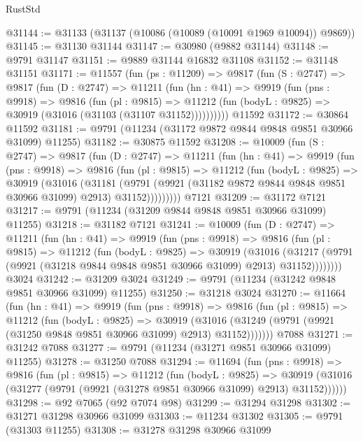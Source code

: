 \begin{lexlean}{RustStd}
\begin{coremodule}
@31144 := @31133 (@31137 (@10086 (@10089 (@10091 @1969 @10094)) @9869))
@31145 := @31130 @31144
@31147 := @30980 (@9882 @31144)
@31148 := @9791 @31147
@31151 := @9889 @31144 @16832 @31108
@31152 := @31148 @31151
@31171 := @11557
    (fun (ps : @11209) =>
    @9817
      (fun (S : @2747) =>
      @9817
        (fun (D : @2747) =>
        @11211
          (fun (hn : @41) =>
          @9919
            (fun (pns : @9918) =>
            @9816
              (fun (pl : @9815) =>
              @11212 (fun (bodyL : @9825) => @30919 (@31016 (@31103 (@31107 @31152))))))))))
    @11592
@31172 := @30864 @11592
@31181 := @9791 (@11234 (@31172 @9872 @9844 @9848 @9851 @30966 @31099) @11255)
@31182 := @30875 @11592
@31208 := @10009
    (fun (S : @2747) =>
    @9817
      (fun (D : @2747) =>
      @11211
        (fun (hn : @41) =>
        @9919
          (fun (pns : @9918) =>
          @9816
            (fun (pl : @9815) =>
            @11212
              (fun (bodyL : @9825) =>
              @30919
                (@31016
                  (@31181
                    (@9791
                      (@9921 (@31182 @9872 @9844 @9848 @9851 @30966 @31099) @2913)
                      @31152)))))))))
    @7121
@31209 := @31172 @7121
@31217 := @9791 (@11234 (@31209 @9844 @9848 @9851 @30966 @31099) @11255)
@31218 := @31182 @7121
@31241 := @10009
    (fun (D : @2747) =>
    @11211
      (fun (hn : @41) =>
      @9919
        (fun (pns : @9918) =>
        @9816
          (fun (pl : @9815) =>
          @11212
            (fun (bodyL : @9825) =>
            @30919
              (@31016
                (@31217 (@9791 (@9921 (@31218 @9844 @9848 @9851 @30966 @31099) @2913) @31152))))))))
    @3024
@31242 := @31209 @3024
@31249 := @9791 (@11234 (@31242 @9848 @9851 @30966 @31099) @11255)
@31250 := @31218 @3024
@31270 := @11664
    (fun (hn : @41) =>
    @9919
      (fun (pns : @9918) =>
      @9816
        (fun (pl : @9815) =>
        @11212
          (fun (bodyL : @9825) =>
          @30919
            (@31016 (@31249 (@9791 (@9921 (@31250 @9848 @9851 @30966 @31099) @2913) @31152)))))))
    @7088
@31271 := @31242 @7088
@31277 := @9791 (@11234 (@31271 @9851 @30966 @31099) @11255)
@31278 := @31250 @7088
@31294 := @11694
    (fun (pns : @9918) =>
    @9816
      (fun (pl : @9815) =>
      @11212
        (fun (bodyL : @9825) =>
        @30919 (@31016 (@31277 (@9791 (@9921 (@31278 @9851 @30966 @31099) @2913) @31152))))))
@31298 := @92 @7065 (@92 @7074 @98)
@31299 := @31294 @31298
@31302 := @31271 @31298 @30966 @31099
@31303 := @11234 @31302
@31305 := @9791 (@31303 @11255)
@31308 := @31278 @31298 @30966 @31099

\end{coremodule}
\end{lexlean}
